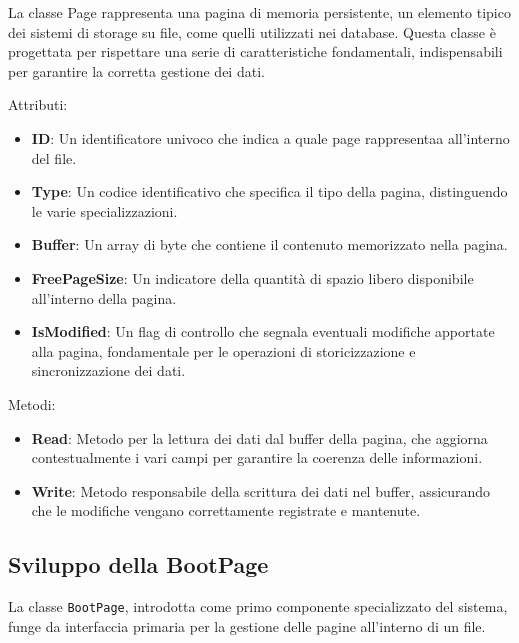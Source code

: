 \documentclass[12pt,a4paper,openright,twoside]{book}
\begin{document}
                La classe Page rappresenta una pagina di memoria persistente, un elemento tipico dei sistemi di storage su file, come quelli utilizzati nei database. Questa classe è progettata per rispettare una serie di caratteristiche fondamentali, indispensabili per garantire la corretta gestione dei dati.

                Attributi:
                \begin{itemize}
                    \item \textbf{ID}: Un identificatore univoco che indica a quale page rappresentaa all'interno del file.
                    \item \textbf{Type}: Un codice identificativo che specifica il tipo della pagina, distinguendo le varie specializzazioni.
                    \item \textbf{Buffer}: Un array di byte che contiene il contenuto memorizzato nella pagina.
                    \item \textbf{FreePageSize}: Un indicatore della quantità di spazio libero disponibile all'interno della pagina.
                    \item \textbf{IsModified}: Un flag di controllo che segnala eventuali modifiche apportate alla pagina, fondamentale per le operazioni di storicizzazione e sincronizzazione dei dati.
                \end{itemize}

                Metodi:
                \begin{itemize}
                    \item \textbf{Read}: Metodo per la lettura dei dati dal buffer della pagina, che aggiorna contestualmente i vari campi per garantire la coerenza delle informazioni.
                    \item \textbf{Write}: Metodo responsabile della scrittura dei dati nel buffer, assicurando che le modifiche vengano correttamente registrate e mantenute.
                \end{itemize}

            \subsection{Sviluppo della BootPage}

                La classe \texttt{BootPage}, introdotta come primo componente specializzato del sistema, funge da interfaccia primaria per la gestione delle pagine all’interno di un file.
\end{document}
